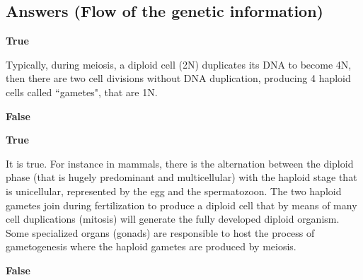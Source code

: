 \subsection{Answers (Flow of the genetic information)}

\begin{Answer} [
   ref={ex7},
   number={7}
 ]

  \Question \textbf{True}

\end{Answer}

\begin{Answer} [
   ref={ex8},
   number={8}
 ]


Typically, during meiosis,  a diploid cell (2N) duplicates its DNA to become
4N, then there are two cell divisions without DNA duplication, producing 4
haploid cells called “gametes", that are 1N.

\end{Answer}

\begin{Answer} [
   ref={ex9},
   number={9}
 ]

  \Question \textbf{False}

\end{Answer}

\begin{Answer} [
   ref={ex10},
   number={10}
 ]


\end{Answer}

\begin{Answer} [
   ref={ex11},
   number={11}
 ]

  \Question \textbf{True}

It is true. For instance in mammals, there is the alternation between the
diploid phase (that is hugely predominant and multicellular) with the haploid
stage that is unicellular, represented by the egg and the spermatozoon.
The two haploid gametes join during fertilization to produce a diploid cell
that by means of many cell duplications (mitosis) will generate the fully
developed diploid organism.
Some specialized organs (gonads) are responsible to host the process of
gametogenesis where the haploid gametes are produced by meiosis.  

\end{Answer}

\begin{Answer} [
   ref={ex12},
   number={12}
 ]

  \Question \textbf{False}

\end{Answer}

